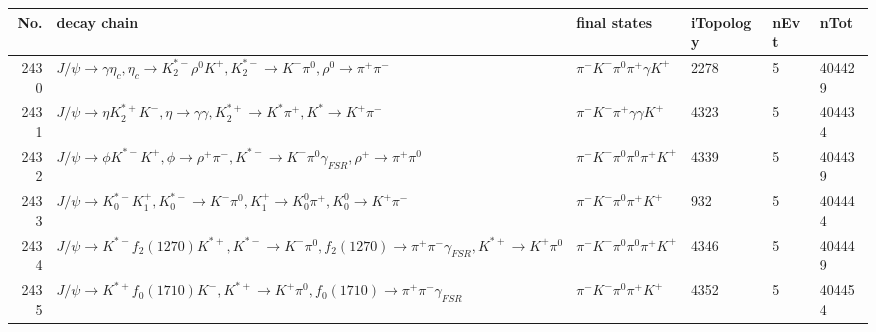 \begin{table}[htbp] 
\begin{center}
\begin{small}
\begin{tabular}{rlllll}\hline\hline
 No. & decay chain & final states &  iTopology & nEvt & nTot \\\hline
2430&$J/\psi       \rightarrow \gamma       \eta_{c}    , \eta_{c}     \rightarrow K_2^{*-}       \rho^{0}      K^{+}          , K_2^{*-}        \rightarrow K^{-}          \pi^{0}        , \rho^{0}       \rightarrow \pi^{+}        \pi^{-}        $&$\pi^{-}        K^{-}          \pi^{0}        \pi^{+}        \gamma       K^{+}          $& 2278&    5&404429\\
2431&$J/\psi       \rightarrow \eta          K_2^{*+}       K^{-}          , \eta           \rightarrow \gamma       \gamma       , K_2^{*+}        \rightarrow K^{*}          \pi^{+}        , K^{*}           \rightarrow K^{+}          \pi^{-}        $&$\pi^{-}        K^{-}          \pi^{+}        \gamma       \gamma       K^{+}          $& 4323&    5&404434\\
2432&$J/\psi       \rightarrow \phi           K^{*-}         K^{+}          , \phi            \rightarrow \rho^{+}      \pi^{-}        , K^{*-}          \rightarrow K^{-}          \pi^{0}        \gamma_{FSR} , \rho^{+}       \rightarrow \pi^{+}        \pi^{0}        $&$\pi^{-}        K^{-}          \pi^{0}        \pi^{0}        \pi^{+}        K^{+}          $& 4339&    5&404439\\
2433&$J/\psi       \rightarrow K_{0}^{*-}     K_1^{+}        , K_{0}^{*-}      \rightarrow K^{-}          \pi^{0}        , K_1^{+}         \rightarrow K_0^{0}        \pi^{+}        , K_0^{0}         \rightarrow K^{+}          \pi^{-}        $&$\pi^{-}        K^{-}          \pi^{0}        \pi^{+}        K^{+}          $&  932&    5&404444\\
2434&$J/\psi       \rightarrow K^{*-}         f_{2}(1270)    K^{*+}         , K^{*-}          \rightarrow K^{-}          \pi^{0}        , f_{2}(1270)     \rightarrow \pi^{+}        \pi^{-}        \gamma_{FSR} , K^{*+}          \rightarrow K^{+}          \pi^{0}        $&$\pi^{-}        K^{-}          \pi^{0}        \pi^{0}        \pi^{+}        K^{+}          $& 4346&    5&404449\\
2435&$J/\psi       \rightarrow K^{*+}         f_{0}(1710)    K^{-}          , K^{*+}          \rightarrow K^{+}          \pi^{0}        , f_{0}(1710)     \rightarrow \pi^{+}        \pi^{-}        \gamma_{FSR} $&$\pi^{-}        K^{-}          \pi^{0}        \pi^{+}        K^{+}          $& 4352&    5&404454\\

\end{tabular}
\end{small}
\end{center}
\end{table}
